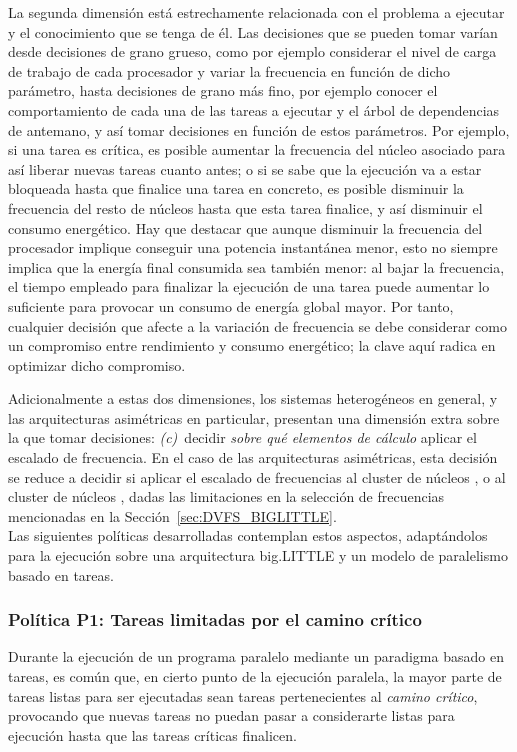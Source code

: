 La segunda dimensión está estrechamente relacionada con el problema a
ejecutar y el conocimiento que se tenga de él. Las decisiones que se pueden
tomar varían desde decisiones de grano grueso, como por ejemplo considerar
el nivel de carga de trabajo de cada procesador y variar la frecuencia en
función de dicho parámetro, hasta decisiones de grano más fino, por ejemplo
conocer el comportamiento de cada una de las tareas a ejecutar y el árbol
de dependencias de antemano, y así tomar decisiones en función de estos
parámetros. Por ejemplo, si una tarea es crítica, es posible aumentar la
frecuencia del núcleo asociado para así liberar nuevas tareas cuanto antes;
o si se sabe que la ejecución va a estar bloqueada hasta que finalice una
tarea en concreto, es posible disminuir la frecuencia del resto de núcleos
hasta que esta tarea finalice, y así disminuir el consumo energético. Hay
que destacar que aunque disminuir la frecuencia del procesador implique
conseguir una potencia instantánea menor, esto no siempre implica que la
energía final consumida sea también menor: al bajar la frecuencia, el
tiempo empleado para finalizar la ejecución de una tarea puede aumentar lo
suficiente para provocar un consumo de energía global mayor. Por tanto,
cualquier decisión que afecte a la variación de frecuencia se debe
considerar como un compromiso entre rendimiento y consumo energético; la
clave aquí radica en optimizar dicho compromiso.

Adicionalmente a estas dos dimensiones, los sistemas heterogéneos en
general, y las arquitecturas asimétricas en particular, presentan una
dimensión extra sobre la que tomar decisiones: {\em (c)}~decidir {\em sobre
  qué elementos de cálculo} aplicar el escalado de frecuencia. En el caso
de las arquitecturas asimétricas, esta decisión se reduce a decidir si
aplicar el escalado de frecuencias al cluster de núcleos \BIG, o al cluster
de núcleos \LITTLE, dadas las limitaciones en la selección de frecuencias
mencionadas en la Sección~\ref{sec:DVFS_BIGLITTLE}.\\
Las siguientes políticas desarrolladas contemplan estos aspectos,
adaptándolos para la ejecución sobre una arquitectura big.LITTLE y un
modelo de paralelismo basado en tareas.

\subsubsection{Política P1: Tareas limitadas por el camino crítico}

Durante la ejecución de un programa paralelo mediante un paradigma basado
en tareas, es común que, en cierto punto de la ejecución paralela, la mayor
parte de tareas listas para ser ejecutadas sean tareas pertenecientes al
{\em camino crítico}, provocando que nuevas tareas no puedan pasar a
considerarte listas para ejecución hasta que las tareas críticas finalicen.

